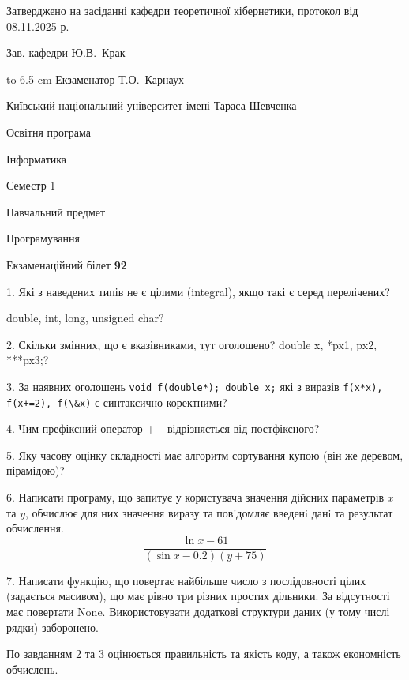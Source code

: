 \documentclass[12pt, ukrainian]{article}
\def\code#1{\Verb!#1!}
\begin{document}
{\smallskip\smallskip \begin {scriptsize} Затверджено на засіданні кафедри теоретичної кібернетики, протокол   від   08.11.2025 р.\par\smallskip\smallskip\smallskip\smallskip
{\parbox {6.5 cm} {Зав. кафедри \dotfill Ю.В.~Крак}}\hspace {0.7cm} {\hbox to 6.5 cm { Екзаменатор \dotfill Т.О.~Карнаух}} \end{scriptsize}}
\vspace{0.9cm}
{{\begin {scriptsize}\par
{ \center  Київський національний університет імені Тараса Шевченка \par}
{\parbox {5 cm}{Освітня програма \hfill}{\parbox {7 cm}{Інформатика\hfill}}\parbox {6 cm}{\hfill Семестр 1}}\par
{\parbox {5 cm} {Навчальний предмет \hfill}\parbox {7 cm}{Програмування \hfill}\parbox {6cm}{\hfill}\par}\vspace{-15pt} \end{scriptsize}}{\center Екзаменаційний білет \No \textbf { 92 }\par}}
{%
1. Які з наведених типів не є цілими (integral), якщо такі є серед перелічених?

double, int, long, unsigned char?
\par
\vspace{2mm}
2. Скільки змінних, що є вказівниками, тут оголошено?
double x, *px1, px2, ***px3;?
\par
\vspace{2mm}
3. За наявних оголошень \code{void f(double*); double x;} які з виразів \code{f(x*x), f(x+=2), f(\&x)} є синтаксично коректними?
\par
\vspace{2mm}
4. Чим префіксний оператор ++ відрізняється від постфіксного?
\par
\vspace{2mm}
5. Яку часову оцінку складності має алгоритм сортування купою (він же деревом, пірамідою)?
\par
\vspace{2mm}
6. Написати програму, що запитує у користувача значення дійсних параметрів $x$ та $y$, обчислює для них значення виразу та повiдомляє введенi данi та результат обчислення.
$$\frac{\ln x - 61}{(\sin x - 0.2) (y + 75)}$$ 

\par
7. Написати функцію, що повертає найбільше число з послідовності цілих (задається масивом), що має рівно три різних простих дільники. За відсутності має повертати None. Використовувати додаткові структури даних (у тому числі рядки) заборонено.

По завданням 2 та 3 оцінюється правильність та якість коду, а також економність обчислень.

}
\end{document}
